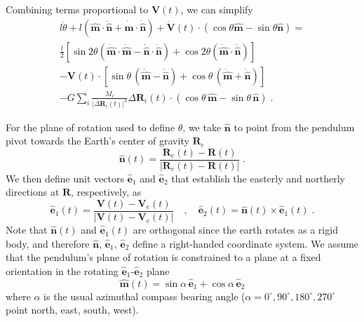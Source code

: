 \documentclass[12pt]{article}
\providecommand{\vecsymbol}[1]{\ensuremath{\boldsymbol{#1}}}
\providecommand{\Rv}{\vecsymbol{R}}
\providecommand{\Vv}{\vecsymbol{V}}
\providecommand{\mv}{\hat{\vecsymbol{m}}}
\providecommand{\nv}{\hat{\vecsymbol{n}}}
\providecommand{\ev}{\hat{\vecsymbol{e}}}
\providecommand{\thddot}{\ddot{\theta}}
\begin{document}
Combining terms proportional to $\Vv(t)$, we can simplify
\begin{multline}
l\thddot + l(\mv\cdot\ddot{\nv} + \dot{\mv}\cdot\dot{\nv}) +
\dot{\Vv}(t)\cdot\left(\cos\theta \mv - \sin\theta \nv\right) =\\
\frac{l}{2} \left[ \sin 2\theta \left( \dot{\mv}\cdot\dot{\mv} - \dot{\nv}\cdot\dot{\nv}\right) +
\cos 2\theta \left(\dot{\mv}\cdot\dot{\nv}\right) \right]\\
-\Vv(t)\cdot\left[ \sin\theta\,(\dot{\mv}-\dot{\nv}) +
\cos\theta\,(\dot{\mv}+\dot{\nv})\right]\\
-G \sum_i \frac{M_i}{\left|\Delta\Rv_i(t)\right|^3} \Delta\Rv_i(t)\cdot(\cos\theta\, \mv - \sin\theta\, \nv) \; .
\label{eqn:ode}
\end{multline}

For the plane of rotation used to define $\theta$, we take $\nv$ to point from the pendulum pivot towards the Earth's center of gravity $\Rv_e$
\begin{equation}
\nv(t) = \frac{\Rv_e(t) - \Rv(t)}{\left|\Rv_e(t) - \Rv(t)\right|} \; .
\end{equation}
We then define unit vectors $\ev_1$ and $\ev_2$ that establish the easterly and northerly directions at $\Rv$, respectively, as
\begin{equation}
\ev_1(t) = \frac{\Vv(t) - \Vv_e(t)}{\left|\Vv(t) - \Vv_e(t)\right|} \quad , \quad
\ev_2(t) = \nv(t) \times \ev_1(t) \; .
\end{equation}
Note that $\nv(t)$ and $\ev_1(t)$ are orthogonal since the earth rotates as a rigid body, and therefore $\nv$, $\ev_1$, $\ev_2$ define a right-handed coordinate system. We assume that the pendulum's plane of rotation is constrained to a plane at a fixed orientation in the rotating $\ev_1$-$\ev_2$ plane
\begin{equation}
\mv(t) = \sin\alpha\,\ev_1 + \cos\alpha\,\ev_2
\end{equation}
where $\alpha$ is the usual azimuthal compass bearing angle ($\alpha = 0^\circ, 90^\circ, 180^\circ, 270^\circ$ point north, east, south, west).
\end{document}
